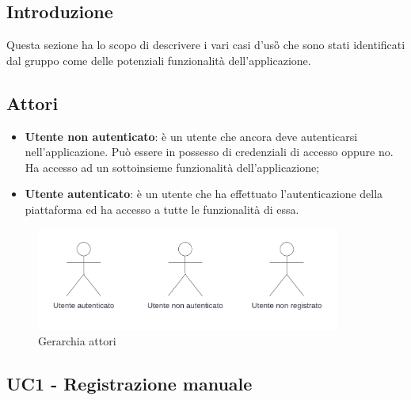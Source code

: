 \subsection{Introduzione}
Questa sezione ha lo scopo di descrivere i vari casi d'uso\G{} che sono stati identificati dal gruppo \teamname{} come delle potenziali funzionalità dell'applicazione.

\subsection{Attori}
\begin{itemize}
    \item \textbf{Utente non autenticato}: 
    è un utente che ancora deve autenticarsi nell'applicazione. Può essere in possesso di credenziali di accesso oppure no. Ha accesso ad un sottoinsieme funzionalità dell'applicazione;
    \item \textbf{Utente autenticato}:
    è un utente che ha effettuato l'autenticazione della piattaforma ed ha accesso a tutte le funzionalità di essa.
\end{itemize}

\begin{figure}[!h]
    \includegraphics[width=10cm]{sezioni/Images/Actors.png}
    \centering
    \caption{Gerarchia attori}
\end{figure}
\newpage
    
\subsection{UC1 - Registrazione manuale}


